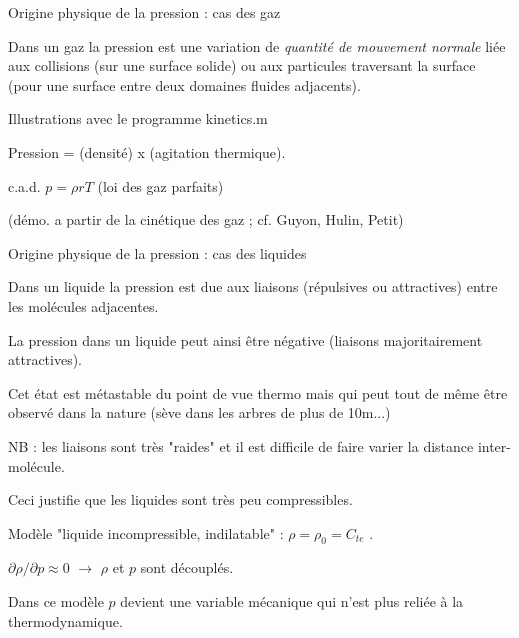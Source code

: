 \begin{frame} {Origine physique de la pression : cas des gaz}

Dans un gaz la pression est une variation de {\em quantité de mouvement normale} 
liée aux collisions (sur une surface solide) ou aux particules traversant la surface (pour une surface entre deux domaines fluides adjacents).

\medskip

{\color{vert} Illustrations avec le programme kinetics.m}

\medskip 

Pression = (densité) x (agitation thermique).

c.a.d. $p = \rho r T$ (loi des gaz parfaits)

\smallskip

(démo. a partir de la cinétique des gaz ; cf. Guyon, Hulin, Petit)

\end{frame}

\begin{frame} {Origine physique de la pression : cas des liquides}

Dans un liquide la pression est due aux liaisons (répulsives ou attractives) entre les molécules adjacentes.

\smallskip

La pression dans un liquide peut ainsi être négative (liaisons majoritairement attractives).

Cet état est métastable du point de vue thermo mais qui peut tout de même être observé dans la nature (sève dans les arbres de plus de 10m...)

\medskip

NB : les liaisons sont très "raides" et il est difficile de faire varier la distance inter-molécule.

Ceci justifie que les liquides sont très peu compressibles. 

\smallskip

Modèle "liquide incompressible, indilatable" : $\rho = \rho_0 = C_{te}$ . 

$\partial \rho / \partial p \approx 0 $ $\rightarrow$ $\rho$ et $p$ sont découplés.  

Dans ce modèle $p$ devient une variable mécanique qui n'est plus reliée à la thermodynamique.



\

\end{frame}

